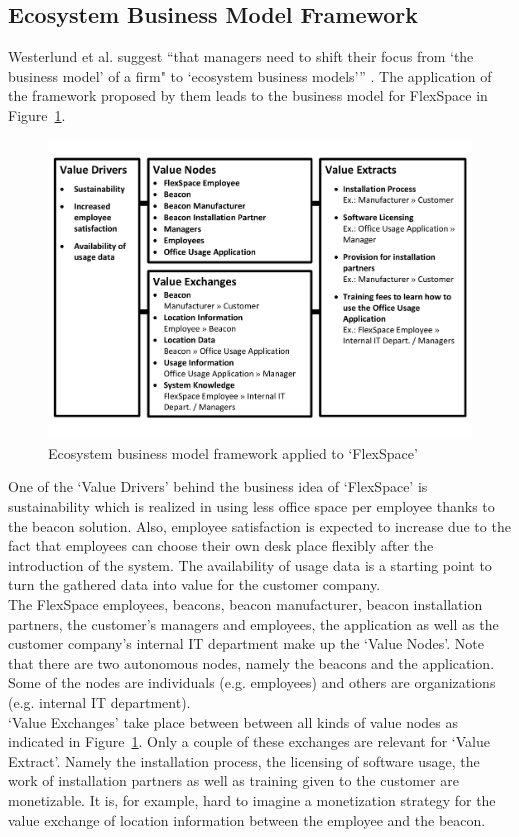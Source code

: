 	\subsection{Ecosystem Business Model Framework}
	\vspace{-1em}
		Westerlund et al. suggest ``that managers need to shift their focus from `the business model' of a firm" to `ecosystem business models''' \cite{westerlund}. The application of the framework proposed by them leads to the business model for FlexSpace in Figure~\ref{fig:use_case_westerlund}.
		\begin{figure}[ht]
		    \begin{center}
		    \includegraphics[scale=0.55]{Talk11/use_case_westerlund.pdf}
		    \end{center}
		    \caption{Ecosystem business model framework applied to `FlexSpace'}
		    \label{fig:use_case_westerlund}
		\end{figure}
		One of the `Value Drivers' behind the business idea of `FlexSpace' is sustainability which is realized in using less office space per employee thanks to the beacon solution. Also, employee satisfaction is expected to increase due to the fact that employees can choose their own desk place flexibly after the introduction of the system. The availability of usage data is a starting point to turn the gathered data into value for the customer company.\\
		The FlexSpace employees, beacons, beacon manufacturer, beacon installation partners, the customer's managers and employees, the application as well as the customer company's internal IT department make up the `Value Nodes'. Note that there are two autonomous nodes, namely the beacons and the application. Some of the nodes are individuals (e.g. employees) and others are organizations (e.g. internal IT department).\\
		`Value Exchanges' take place between between all kinds of value nodes as indicated in Figure~\ref{fig:use_case_westerlund}. Only a couple of these exchanges are relevant for `Value Extract'. Namely the installation process, the licensing of software usage, the work of installation partners as well as training given to the customer are monetizable. It is, for example, hard to imagine a monetization strategy for the value exchange of location information between the employee and the beacon.
	\vspace{-1em}
